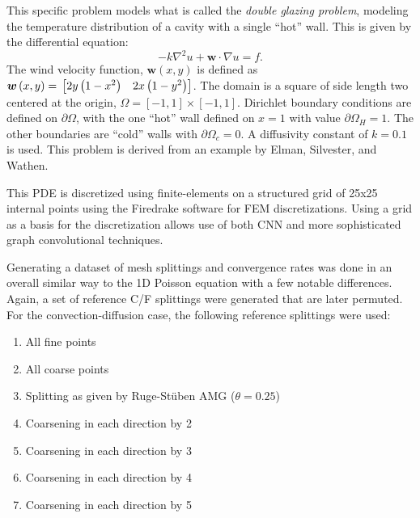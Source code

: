 \documentclass{siamart190516}
\renewcommand{\vec}[1]{\bm{{#1}}}
\newcommand{\grad}{\nabla}
\begin{document}
This specific problem models what is called the \textit{double glazing problem}, modeling the temperature distribution of a cavity with a single ``hot'' wall.  This is given by the differential equation:
%
\begin{equation}\label{eqn:conv}
  -k\grad^2u + \vec{w}\cdot\grad u = f.
\end{equation}
%
The wind velocity function, $\vec{w}\left(x,y\right)$ is defined as $\vec{w}\left(x,y\right)=\\ \begin{bmatrix} 2y\left(1-x^2\right) & 2x\left(1-y^2\right) \end{bmatrix}$.  The domain is a square of side length two centered at the origin, $\Omega = \left[-1,1\right] \times \left[-1,1\right]$.  Dirichlet boundary conditions are defined on $\partial \Omega$, with the one ``hot'' wall defined on $x=1$ with value $\partial \Omega_H=1$.  The other boundaries are ``cold'' walls with $\partial \Omega_c=0$.  A diffusivity constant of $k=0.1$ is used.  This problem is derived from an example by Elman, Silvester, and Wathen\cite{silvester}.

This PDE is discretized using finite-elements on a structured grid of 25x25 internal points using the Firedrake software for FEM discretizations\cite{Dalcin2011, Rathgeber2016,Homolya2016,McRae2016,MUMPS01,MUMPS02}.  Using a grid as a basis for the discretization allows use of both CNN and more sophisticated graph convolutional techniques.

Generating a dataset of mesh splittings and convergence rates was done in an overall similar way to the 1D Poisson equation with a few notable differences.  Again, a set of reference C/F splittings were generated that are later permuted.  For the convection-diffusion case, the following reference splittings were used:

\begin{enumerate}
\item All fine points
\item All coarse points
\item Splitting as given by Ruge-St\"{u}ben AMG ($\theta=0.25$) \cite{rs, pyamg}
\item Coarsening in each direction by 2
\item Coarsening in each direction by 3
\item Coarsening in each direction by 4
\item Coarsening in each direction by 5
\end{enumerate}
\end{document}
